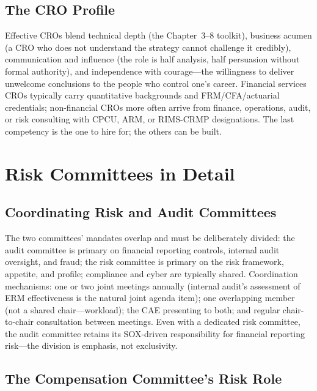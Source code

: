 \documentclass[11pt,openany]{book}
\begin{document}
\subsection{The CRO Profile}

Effective CROs blend technical depth (the Chapter~3--8 toolkit), business
acumen (a CRO who does not understand the strategy cannot challenge it
credibly), communication and influence (the role is half analysis, half
persuasion without formal authority), and independence with courage---the
willingness to deliver unwelcome conclusions to the people who control one's
career. Financial services CROs typically carry quantitative backgrounds and
FRM/CFA/actuarial credentials; non-financial CROs more often arrive from
finance, operations, audit, or risk consulting with CPCU, ARM, or RIMS-CRMP
designations. The last competency is the one to hire for; the others can be
built.

\section{Risk Committees in Detail}
\label{sec:committees}

\subsection{Coordinating Risk and Audit Committees}

The two committees' mandates overlap and must be deliberately divided: the
audit committee is primary on financial reporting controls, internal audit
oversight, and fraud; the risk committee is primary on the risk framework,
appetite, and profile; compliance and cyber are typically shared.
Coordination mechanisms: one or two joint meetings annually (internal audit's
assessment of ERM effectiveness is the natural joint agenda item); one
overlapping member (not a shared chair---workload); the CAE presenting to
both; and regular chair-to-chair consultation between meetings. Even with a
dedicated risk committee, the audit committee retains its SOX-driven
responsibility for financial reporting risk---the division is emphasis, not
exclusivity.

\subsection{The Compensation Committee's Risk Role}
\end{document}
